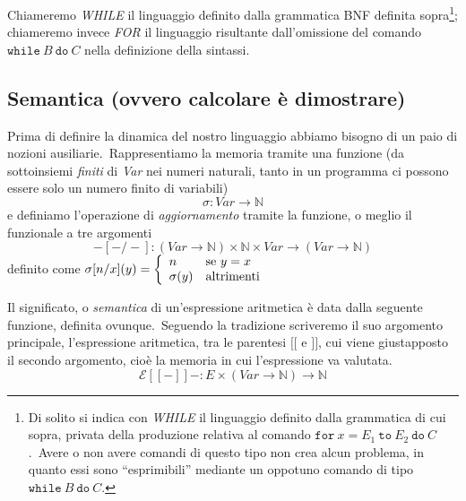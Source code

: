 \noindent Chiameremo \textit{\footnotesize WHILE} il linguaggio definito dalla grammatica BNF definita sopra\footnote{Di solito si indica con \textit{\scriptsize WHILE} il linguaggio definito dalla grammatica di cui sopra, privata della produzione relativa al comando $\mathtt{for}\ x = E_1\ \mathtt{to}\ E_2\ \mathtt{do}\ C$.\ Avere o non avere comandi di questo tipo non crea alcun problema, in quanto essi sono ``esprimibili'' mediante un oppotuno comando di tipo $\mathtt{while}\ B\ \mathtt{do}\ C$.}; chiameremo invece \textit{\footnotesize FOR} il linguaggio risultante dall'omissione del comando $\mathtt{while}\ B\ \mathtt{do}\ C$ nella definizione della sintassi.\

\subsection*{Semantica (ovvero calcolare è dimostrare)}

Prima di definire la dinamica del nostro linguaggio abbiamo bisogno di un paio di nozioni ausiliarie.\
Rappresentiamo la memoria tramite una funzione (da sottoinsiemi \textit{finiti} di \textit{Var} nei numeri naturali, tanto in un programma ci possono essere solo un numero finito di variabili)
\[\sigma : \mathit{Var} \rightarrow \mathbb{N}\]
e definiamo l'operazione di \textit{aggiornamento} tramite la funzione, o meglio il funzionale a tre argomenti
\[ -[-/-]:(\mathit{Var}\rightarrow \mathbb{N}) \times \mathbb{N} \times \mathit{Var} \rightarrow (\mathit{Var} \rightarrow \mathbb{N}) \]
definito come \qquad
$\sigma[n/x](y) = \left\{\begin{array}{l l}
        n         & \mathrm{se}\ y=x    \\
        \sigma(y) & \mathrm{altrimenti} \\
    \end{array} \right.$

\vspace{12pt}

\noindent Il significato, o \textit{semantica} di un'espressione aritmetica è data dalla seguente funzione, definita ovunque.\
Seguendo la tradizione scriveremo il suo argomento principale, l'espressione aritmetica, tra le parentesi $[\![$ e $]\!]$, cui viene giustapposto il secondo argomento, cioè la memoria in cui l'espressione va valutata.\
\[\mathcal{E} [\![-]\!]- : E \times (\mathit{Var} \rightarrow \mathbb{N})\rightarrow\mathbb{N}\]

